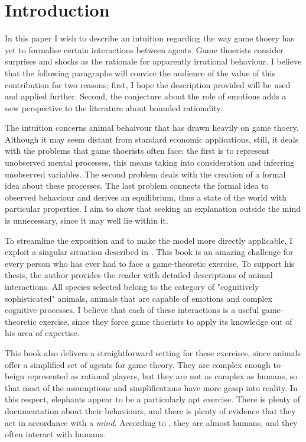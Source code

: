 
\section{Introduction}

In this paper I wish to describe an intuition regarding the way game thoery has yet to formalise certain interactions between agents. Game thoerists consider surprises and shocks as the rationale for apparently irrational behaviour. I believe that the following paragraphs will convice the audience of the value of this contribution for two reasons; first, I hope the description provided will be used and applied further. Second, the conjecture about the role of emotions adds a new perspective to the literature about bounded rationality.

\vspace*{1em}
The intuition concerns animal behaivour that has drawn heavily on game thoery. Although it may seem distant from standard economic applications, still, it deals with the problems that game thoerists often face: the first is to represent unobserved mental processes, this means taking into consideration and inferring unobserved variables. The second problem deals with the creation of a formal idea about these processes. The last problem connects the formal idea to observed behaviour and derives an equilibrium, thus a state of the world with particular properties. I aim to show that seeking an explanation outside the mind is unnecessary, since it may well lie within it.

\vspace*{1em}
To streamline the exposition and to make the model more directly applicable, I exploit a singular situation described in \textcite{safinaWordsWhatAnimals2015}. This book is an amazing challenge for every person who has ever had to face a game-theoretic exercise. To support his thesis, the author provides the reader with detailed descriptions of animal interactions. All species selected belong to the category of "cognitively sophisticated" animals, animals that are capable of emotions and complex cognitive processes.
I believe that each of these interactions is a useful game-theoretic exercise, since they force game thoerists to apply its knowledge out of his area of expertise.

\vspace*{1em}
This book also delivers a straightforward setting for these exercises, since animals offer a simplified set of agents for game theory. They are complex enough to beign represented as rational players, but they are not as complex as humans, so that most of the assumptions and simplifications have more grasp into reality. 
In this respect, elephants appear to be a particularly apt exercise. There is plenty of documentation about their behaviours, and there is plenty of evidence that they act in accordance with a \textit{mind}. According to \textcite{safinaWordsWhatAnimals2015}, they are almost humans, and they often interact with humans.

